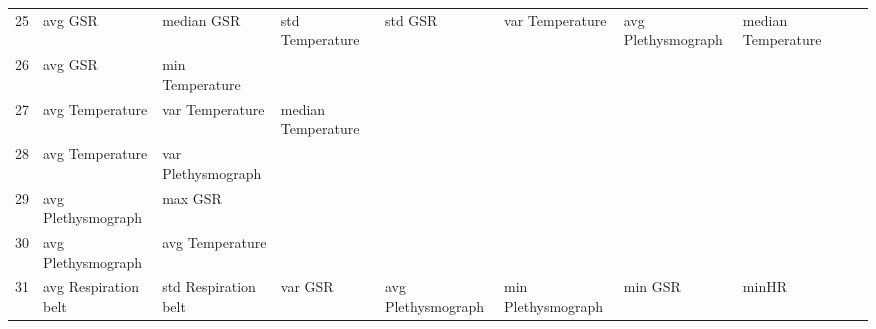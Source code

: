 \begin{landscape}
\begin{table}[]
\begin{tabular}{l|llllllll}
25       & avg GSR                 & median GSR              & std Temperature         & std GSR                 & var Temperature         & avg Plethysmograph    & median Temperature      &                         &                         &         \\
26       & avg GSR                 & min Temperature         &                         &                         &                         &                       &                         &                         &                         &         \\
27       & avg Temperature         & var Temperature         & median Temperature      &                         &                         &                       &                         &                         &                         &         \\
28       & avg Temperature         & var Plethysmograph      &                         &                         &                         &                       &                         &                         &                         &         \\
29       & avg Plethysmograph      & max GSR                 &                         &                         &                         &                       &                         &                         &                         &         \\
30       & avg Plethysmograph      & avg Temperature         &                         &                         &                         &                       &                         &                         &                         &         \\
31       & avg Respiration belt    & std Respiration belt    & var GSR                 & avg Plethysmograph      & min Plethysmograph      & min GSR               & minHR                   &                         &                         &         \\
\end{tabular}
\end{table}
\end{landscape}
\clearpage
